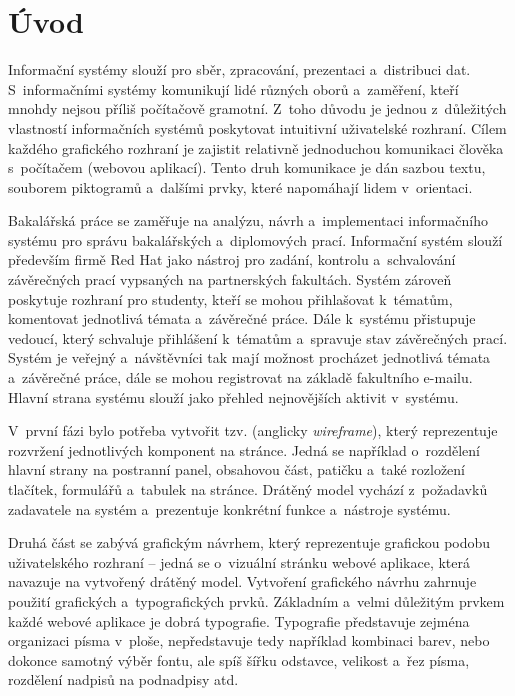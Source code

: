 \chapter{Úvod}

Informační systémy slouží pro sběr, zpracování, prezentaci a~distribuci dat. S~informačními systémy komunikují lidé různých oborů a~zaměření, kteří mnohdy nejsou příliš počítačově gramotní. Z~toho důvodu je jednou z~důležitých vlastností informačních systémů poskytovat intuitivní uživatelské rozhraní. Cílem každého grafického rozhraní je zajistit relativně jednoduchou komunikaci člověka s~počítačem (webovou aplikací). Tento druh komunikace je dán sazbou textu, souborem piktogramů a~dalšími prvky, které napomáhají lidem v~orientaci.

Bakalářská práce se zaměřuje na analýzu, návrh a~implementaci informačního systému pro správu bakalářských a~diplomových prací. Informační systém slouží především firmě Red Hat jako nástroj pro zadání, kontrolu a~schvalování závěrečných prací vypsaných na partnerských fakultách. Systém zároveň poskytuje rozhraní pro studenty, kteří se mohou přihlašovat k~tématům, komentovat jednotlivá témata a~závěrečné práce. Dále k~systému přistupuje vedoucí, který schvaluje přihlášení k~tématům a~spravuje stav závěrečných prací. Systém je veřejný a~návštěvníci tak mají možnost procházet jednotlivá témata a~závěrečné práce, dále se mohou registrovat na základě fakultního e-mailu. Hlavní strana systému slouží jako přehled nejnovějších aktivit v~systému.

V~první fázi bylo potřeba vytvořit tzv.  (anglicky \textit{wireframe}), který reprezentuje rozvržení jednotlivých komponent na stránce. Jedná se například o~rozdělení hlavní strany na postranní panel, obsahovou část, patičku a~také rozložení tlačítek, formulářů a~tabulek na stránce. Drátěný model vychází z~požadavků zadavatele na systém a~prezentuje konkrétní funkce a~nástroje systému.

Druhá část se zabývá grafickým návrhem, který reprezentuje grafickou podobu uživatelského rozhraní -- jedná se o~vizuální stránku webové aplikace, která navazuje na vytvořený drátěný model. Vytvoření grafického návrhu zahrnuje použití grafických a~typografických prvků. Základním a~velmi důležitým prvkem každé webové aplikace je dobrá typografie. Typografie představuje zejména organizaci písma v~ploše, nepředstavuje tedy například kombinaci barev, nebo dokonce samotný výběr fontu, ale spíš šířku odstavce, velikost a~řez písma, rozdělení nadpisů na podnadpisy atd.

